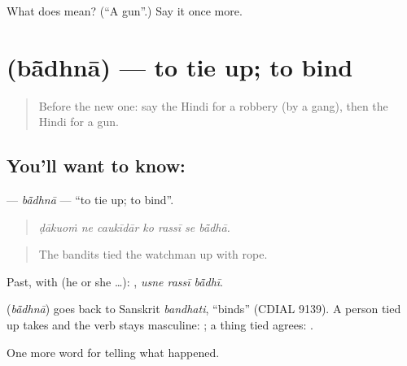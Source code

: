 \begin{tcolorbox}[breakable,colback=teal!4,colframe=teal!35!black,title={Before you move on}]
What does  mean? (\textquotedblleft{}A gun\textquotedblright{}.) Say it once more.
\end{tcolorbox}
\section[\texorpdfstring{\hi{बाँधना} (bā̃dhnā)}{बाँधना (bā̃dhnā)}]{ (bā̃dhnā) — to tie up; to bind}

\label{lesson:HI-C292-badhna}



\begin{quote}
Before the new one: say the Hindi for a robbery (by a gang), then the Hindi for a gun.
\end{quote}

\subsection*{You'll want to know: }
\textbf{} — \emph{bā̃dhnā} — \textquotedblleft{}to tie up; to bind\textquotedblright{}.

\begin{quote}
      
\end{quote}

\begin{quote}
\emph{ḍākuoṁ ne caukīdār ko rassī se bā̃dhā.}
\end{quote}

\begin{quote}
The bandits tied the watchman up with rope.
\end{quote}

Past, with  (he or she …):   , \emph{usne rassī bā̃dhī}.

\begin{cousinweb}
\textbf{} (\emph{bā̃dhnā}) goes back to Sanskrit \emph{bandhati}, \textquotedblleft{}binds\textquotedblright{} (CDIAL 9139). A person tied up takes \textbf{} and the verb stays masculine: \textbf{  }; a thing tied agrees: \textbf{ }.
\end{cousinweb}

\begin{grammarlens}[title={What you've built}]
One more word for telling what happened.
\end{grammarlens}

